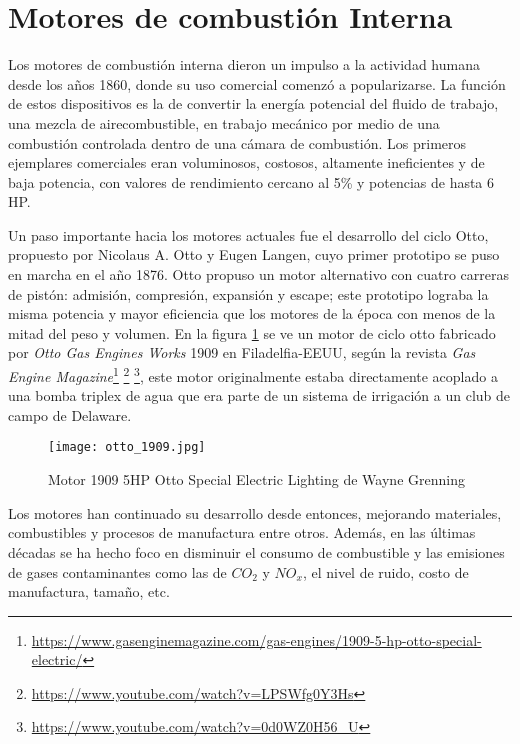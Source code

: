 \section{Motores de combustión Interna}

Los motores de combustión interna dieron un impulso a la actividad humana
desde los años 1860, donde su uso comercial comenzó a popularizarse.
%
La función de estos dispositivos es la de convertir la energía potencial del
fluido de trabajo, una mezcla de aire\-combustible, en trabajo mecánico por
medio de una combustión controlada dentro de una cámara de combustión.
%
Los primeros ejemplares comerciales eran voluminosos, costosos, altamente
ineficientes y de baja potencia, con valores de rendimiento cercano al 5\% y
potencias de hasta 6 HP.

Un paso importante hacia los motores actuales fue el desarrollo del ciclo Otto,
propuesto por Nicolaus A. Otto y Eugen Langen, cuyo primer prototipo se puso en
marcha en el año 1876.
%
Otto propuso un motor alternativo con cuatro carreras de pistón: admisión,
compresión, expansión y escape; este prototipo lograba la misma potencia y
mayor eficiencia que los motores de la época con menos de la mitad del peso y
volumen.
%
En la figura \ref{fig:otto1909} se ve un motor de ciclo otto fabricado por
\emph{Otto Gas Engines Works} 1909 en Filadelfia-EEUU, según la revista
\emph{Gas Engine
Magazine}\footnote{\url{https://www.gasenginemagazine.com/gas-engines/1909-5-hp-otto-special-electric/}}
\footnote{ \url{https://www.youtube.com/watch?v=LPSWfg0Y3Hs} } \footnote{
    \url{https://www.youtube.com/watch?v=0d0WZ0H56_U} }, este motor
originalmente estaba directamente acoplado a una bomba triplex de agua que era
parte de un sistema de irrigación a un club de campo de Delaware.

\begin{figure}
    \centering
    \texttt{[image: otto\_1909.jpg]}
    \caption{Motor 1909 5HP Otto Special Electric Lighting de Wayne Grenning}\label{fig:otto1909}
\end{figure}

Los motores han continuado su desarrollo desde entonces, mejorando materiales,
combustibles y procesos de manufactura entre otros.
%
Además, en las últimas décadas se ha hecho foco en disminuir el consumo de
combustible y las emisiones de gases contaminantes como las de $CO_2$ y $NO_x$,
el nivel de ruido, costo de manufactura, tamaño, etc.

